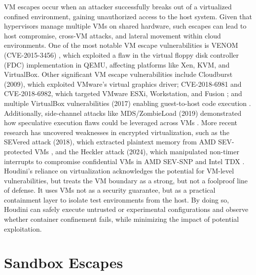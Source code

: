 \begin{doublespace}
VM escapes occur when an attacker successfully breaks out of a virtualized confined environment, gaining unauthorized access to the host system. Given that hypervisors manage multiple VMs on shared hardware, such escapes can lead to host compromise, cross-VM attacks, and lateral movement within cloud environments. One of the most notable VM escape vulnerabilities is VENOM (CVE-2015-3456) \cite{abdoul2018novel}, which exploited a flaw in the virtual floppy disk controller (FDC) implementation in QEMU, affecting platforms like Xen, KVM, and VirtualBox. Other significant VM escape vulnerabilities include Cloudburst (2009), which exploited VMware's virtual graphics driver; CVE-2018-6981 and CVE-2018-6982, which targeted VMware ESXi, Workstation, and Fusion \cite{vmware2018escape}; and multiple VirtualBox vulnerabilities (2017) enabling guest-to-host code execution \cite{virtualbox2017bugs}. Additionally, side-channel attacks like MDS/ZombieLoad (2019) demonstrated how speculative execution flaws could be leveraged across VMs \cite{mds2019attack}. More recent research has uncovered weaknesses in encrypted virtualization, such as the SEVered attack (2018), which extracted plaintext memory from AMD SEV-protected VMs \cite{severed2018}, and the Heckler attack (2024), which manipulated non-timer interrupts to compromise confidential VMs in AMD SEV-SNP and Intel TDX \cite{heckler2024}.\\

Houdini’s reliance on virtualization acknowledges the potential for VM-level vulnerabilities, but treats the VM boundary as a strong, but not a foolproof line of defense. It uses VMs not as a security guarantee, but as a practical containment layer to isolate test environments from the host. By doing so, Houdini can safely execute untrusted or experimental configurations and observe whether container confinement fails, while minimizing the impact of potential exploitation.

\section{Sandbox Escapes} 


\end{doublespace}
